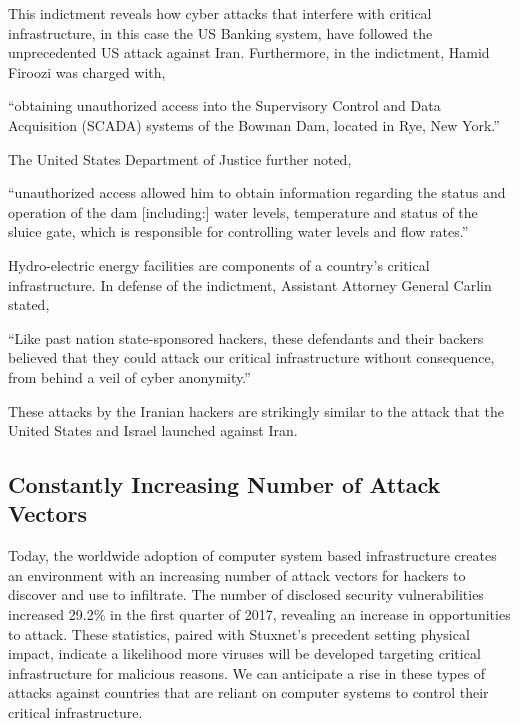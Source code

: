 \documentclass[12pt]{article}
\begin{document}
\begin{multicols}{2}
This indictment reveals how cyber attacks that interfere with critical infrastructure, in this case the US Banking system, have followed the unprecedented US attack against Iran. Furthermore, in the indictment, Hamid Firoozi was charged with,

\begin{displayquote}
``obtaining unauthorized access into the Supervisory Control and Data Acquisition (SCADA) systems of the Bowman Dam, located in Rye, New York.''\cite{sevenIraniansIndicted}
\end{displayquote}

The United States Department of Justice further noted,

\begin{displayquote}
``unauthorized access allowed him to obtain information regarding the status and operation of the dam [including:] water levels, temperature and status of the sluice gate, which is responsible for controlling water levels and flow rates.''\cite{sevenIraniansIndicted}
\end{displayquote}

Hydro-electric energy facilities are components of a country's critical infrastructure. In defense of the indictment, Assistant Attorney General Carlin stated,

\begin{displayquote}
``Like past nation state-sponsored hackers, these defendants and their backers believed that they could attack our critical infrastructure without consequence, from behind a veil of cyber anonymity.''\cite{sevenIraniansIndicted}
\end{displayquote}

These attacks by the Iranian hackers are strikingly similar to the attack that the United States and Israel launched against Iran.

\subsection{Constantly Increasing Number of Attack Vectors}

Today, the worldwide adoption of computer system based infrastructure creates an environment with an increasing number of attack vectors for hackers to discover and use to infiltrate. The number of disclosed security vulnerabilities increased 29.2\% in the first quarter of 2017, revealing an increase in opportunities to attack.\cite{industrialCyberVulnerabilities} These statistics, paired with Stuxnet's precedent setting physical impact, indicate a likelihood more viruses will be developed targeting critical infrastructure for malicious reasons.\cite{industrialCyberVulnerabilities} We can anticipate a rise in these types of attacks against countries that are reliant on computer systems to control their critical infrastructure.


\end{multicols}
\end{document}
